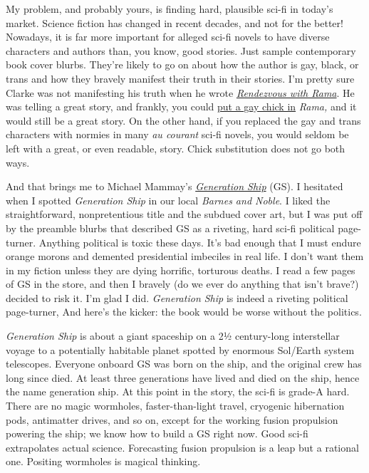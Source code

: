 My problem, and probably yours, is finding hard, plausible sci-fi in
today's market. Science fiction has changed in recent decades, and not
for the better! Nowadays, it is far more important for alleged sci-fi
novels to have diverse characters and authors than, you know, good
stories. Just sample contemporary book cover blurbs. They're likely to
go on about how the author is gay, black, or trans and how they bravely
manifest their truth in their stories. I'm pretty sure Clarke was not
manifesting his truth when he wrote
\href{https://www.amazon.com/Rendezvous-Rama-Arthur-C-Clarke/dp/0553287893}{\emph{Rendezvous
with Rama}}. He was telling a great story, and frankly, you could
\href{https://www.youtube.com/watch?v=9vJDcCcANnU}{put a gay chick in}
\emph{Rama,} and it would still be a great story. On the other hand, if
you replaced the gay and trans characters with normies in many \emph{au
courant} sci-fi novels, you would seldom be left with a great, or even
readable, story. Chick substitution does not go both ways.

And that brings me to Michael Mammay's
\href{https://www.goodreads.com/book/show/63876699-generation-ship}{\emph{Generation
Ship}} (GS). I hesitated when I spotted \emph{Generation Ship} in our
local \emph{Barnes and Noble}. I liked the straightforward,
nonpretentious title and the subdued cover art, but I was put off by the
preamble blurbs that described GS as a riveting, hard sci-fi political
page-turner. Anything political is toxic these days. It's bad enough
that I must endure orange morons and demented presidential imbeciles in
real life. I don't want them in my fiction unless they are dying
horrific, torturous deaths. I read a few pages of GS in the store, and
then I bravely (do we ever do anything that isn't brave?) decided to
risk it. I'm glad I did. \emph{Generation Ship} is indeed a riveting
political page-turner, And here's the kicker: the book would be worse
without the politics.

\emph{Generation Ship} is about a giant spaceship on a 2½ century-long
interstellar voyage to a potentially habitable planet spotted by
enormous Sol/Earth system telescopes. Everyone onboard GS was born on
the ship, and the original crew has long since died. At least three
generations have lived and died on the ship, hence the name generation
ship. At this point in the story, the sci-fi is grade-A hard. There are
no magic wormholes, faster-than-light travel, cryogenic hibernation
pods, antimatter drives, and so on, except for the working fusion
propulsion powering the ship; we know how to build a GS right now. Good
sci-fi extrapolates actual science. Forecasting fusion propulsion is a
leap but a rational one. Positing wormholes is magical thinking.

